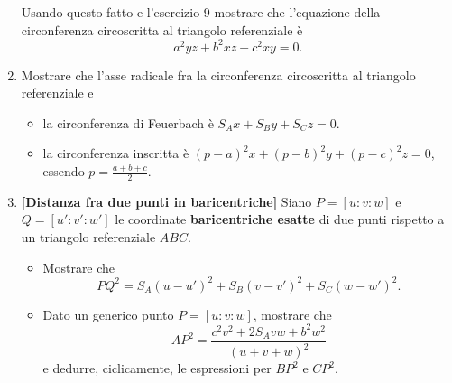 \begin{enumerate}
	Usando questo fatto e l'esercizio 9 mostrare che l'equazione della circonferenza circoscritta al triangolo referenziale è
	\begin{equation}
	a^2yz+b^2xz+c^2xy=0.
	\end{equation}
	\item Mostrare che l'asse radicale fra la circonferenza circoscritta al triangolo referenziale e 
		\begin{itemize}
			\item la circonferenza di Feuerbach è $S_Ax+S_By+S_Cz=0$.
			\item la circonferenza inscritta è $(p-a)^2x+(p-b)^2y+(p-c)^2z=0$, essendo $p=\displaystyle\frac{a+b+c}{2}$.
		\end{itemize} 
	\item \textbf{[Distanza fra due punti in baricentriche]} Siano $P=[u:v:w]$ e $Q=[u':v':w']$ le coordinate \textbf{baricentriche esatte} di due punti rispetto a un triangolo referenziale $ABC$.
	\begin{itemize} 
	\item Mostrare che
	\begin{equation}
	PQ^2=S_A(u-u')^2+S_B(v-v')^2+S_C(w-w')^2.
	\end{equation}
	\item Dato un generico punto $P=[u:v:w]$, mostrare che 
	\begin{equation}
	AP^2=\frac{c^2v^2+2S_Avw+b^2w^2}{(u+v+w)^2}
	\end{equation}
	e dedurre, ciclicamente, le espressioni per $BP^2$ e $CP^2$.
	\end{itemize}
\end{enumerate}
\clearpage

